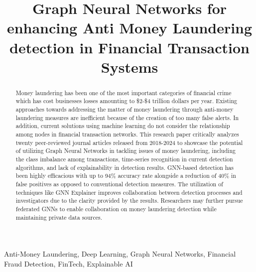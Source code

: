 \documentclass[conference]{IEEEtran}
\begin{document}
\title{Graph Neural Networks for enhancing Anti Money Laundering detection in Financial Transaction Systems}

\author{
}


\maketitle

\begin{abstract}
Money laundering has been one of the most important categories of financial crime which has cost businesses losses amounting to \$2-\$4 trillion dollars per year. Existing approaches towards addressing the matter of money laundering through anti-money laundering measures are inefficient because of the creation of too many false alerts. In addition, current solutions using machine learning do not consider the relationship among nodes in financial transaction networks. This research paper critically analyzes twenty peer-reviewed journal articles released from 2018-2024 to showcase the potential of utilizing Graph Neural Networks in tackling issues of money laundering, including the class imbalance among transactions, time-series recognition in current detection algorithms, and lack of explainability in detection results. GNN-based detection has been highly efficacious with up to 94\% accuracy rate alongside a reduction of 40\% in false positives as opposed to conventional detection measures. The utilization of techniques like GNN Explainer improves collaboration between detection processes and investigators due to the clarity provided by the results. Researchers may further pursue federated GNNs to enable collaboration on money laundering detection while maintaining private data sources.
\end{abstract}

\begin{IEEEkeywords}
Anti-Money Laundering, Deep Learning, Graph Neural Networks, Financial Fraud Detection, FinTech, Explainable AI
\end{IEEEkeywords}

\end{document}
